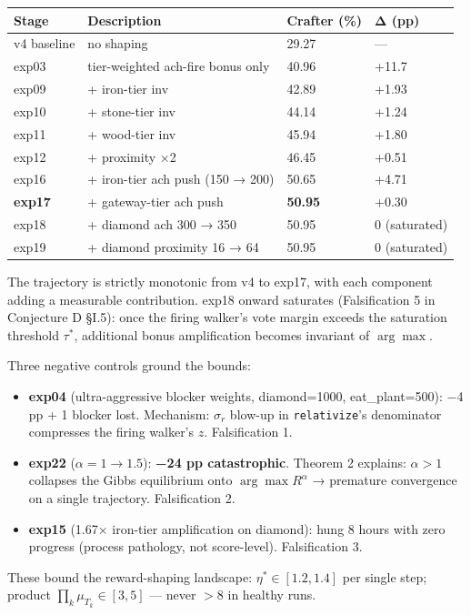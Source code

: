 \begin{tabular}{l l l l}
\toprule
Stage & Description & Crafter (\%) & Δ (pp) \\
\midrule
v4 baseline & no shaping & 29.27 & — \\
exp03 & tier-weighted ach-fire bonus only & 40.96 & +11.7 \\
exp09 & + iron-tier inv & 42.89 & +1.93 \\
exp10 & + stone-tier inv & 44.14 & +1.24 \\
exp11 & + wood-tier inv & 45.94 & +1.80 \\
exp12 & + proximity ×2 & 46.45 & +0.51 \\
exp16 & + iron-tier ach push (150 → 200) & 50.65 & +4.71 \\
\textbf{exp17} & + gateway-tier ach push & \textbf{50.95} & +0.30 \\
exp18 & + diamond ach 300 → 350 & 50.95 & 0 (saturated) \\
exp19 & + diamond proximity 16 → 64 & 50.95 & 0 (saturated) \\
\bottomrule
\end{tabular}

The trajectory is strictly monotonic from v4 to exp17, with each
component adding a measurable contribution. exp18 onward saturates
(Falsification 5 in Conjecture D §I.5): once the firing walker's vote
margin exceeds the saturation threshold $\tau^*$, additional bonus
amplification becomes invariant of $\arg\max$.

Three negative controls ground the bounds:

\begin{itemize}
\item \textbf{exp04} (ultra-aggressive blocker weights, diamond=1000, eat\_plant=500): −4 pp + 1 blocker lost. Mechanism: $\sigma_r$ blow-up in \texttt{relativize}'s denominator compresses the firing walker's $z$. Falsification 1.
\item \textbf{exp22} ($\alpha = 1 \to 1.5$): \textbf{−24 pp catastrophic}. Theorem 2 explains: $\alpha > 1$ collapses the Gibbs equilibrium onto $\arg\max R^\alpha$ → premature convergence on a single trajectory. Falsification 2.
\item \textbf{exp15} (1.67× iron-tier amplification on diamond): hung 8 hours with zero progress (process pathology, not score-level). Falsification 3.
\end{itemize}
These bound the reward-shaping landscape: $\eta^* \in [1.2, 1.4]$ per
single step; product $\prod_k \mu_{T_k} \in [3, 5]$ — never $> 8$ in
healthy runs.

